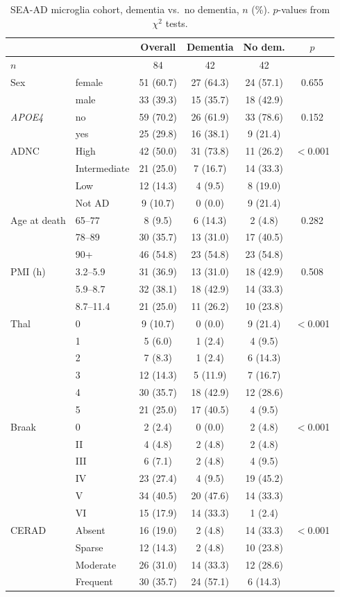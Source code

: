 \documentclass[10pt,twocolumn,letterpaper]{article}
\newcommand{\gene}[1]{\textit{#1}}
\begin{document}
\begin{table}[!htb]
\centering\scriptsize
\caption{SEA-AD microglia cohort, dementia vs.\ no dementia, $n$ (\%). $p$-values from $\chi^2$ tests.}
\label{tab:cohort}
\setlength{\tabcolsep}{2.5pt}
\begin{tabular}{llccc c}
\toprule
& & Overall & Dementia & No dem. & $p$ \\
\midrule
$n$ & & 84 & 42 & 42 & \\
Sex & female & 51 (60.7) & 27 (64.3) & 24 (57.1) & 0.655 \\
 & male & 33 (39.3) & 15 (35.7) & 18 (42.9) & \\
\gene{APOE4} & no & 59 (70.2) & 26 (61.9) & 33 (78.6) & 0.152\\
 & yes & 25 (29.8) & 16 (38.1) & 9 (21.4) & \\
ADNC & High & 42 (50.0) & 31 (73.8) & 11 (26.2) & $<$0.001\\
 & Intermediate & 21 (25.0) & 7 (16.7) & 14 (33.3) & \\
 & Low & 12 (14.3) & 4 (9.5) & 8 (19.0) & \\
 & Not AD & 9 (10.7) & 0 (0.0) & 9 (21.4) & \\
Age at death & 65--77 & 8 (9.5) & 6 (14.3) & 2 (4.8) & 0.282\\
 & 78--89 & 30 (35.7) & 13 (31.0) & 17 (40.5) & \\
 & 90+ & 46 (54.8) & 23 (54.8) & 23 (54.8) & \\
PMI (h) & 3.2--5.9 & 31 (36.9) & 13 (31.0) & 18 (42.9) & 0.508\\
 & 5.9--8.7 & 32 (38.1) & 18 (42.9) & 14 (33.3) & \\
 & 8.7--11.4 & 21 (25.0) & 11 (26.2) & 10 (23.8) & \\
Thal & 0 & 9 (10.7) & 0 (0.0) & 9 (21.4) & $<$0.001\\
 & 1 & 5 (6.0) & 1 (2.4) & 4 (9.5) & \\
 & 2 & 7 (8.3) & 1 (2.4) & 6 (14.3) & \\
 & 3 & 12 (14.3) & 5 (11.9) & 7 (16.7) & \\
 & 4 & 30 (35.7) & 18 (42.9) & 12 (28.6) & \\
 & 5 & 21 (25.0) & 17 (40.5) & 4 (9.5) & \\
Braak & 0 & 2 (2.4) & 0 (0.0) & 2 (4.8) & $<$0.001\\
 & II & 4 (4.8) & 2 (4.8) & 2 (4.8) & \\
 & III & 6 (7.1) & 2 (4.8) & 4 (9.5) & \\
 & IV & 23 (27.4) & 4 (9.5) & 19 (45.2) & \\
 & V & 34 (40.5) & 20 (47.6) & 14 (33.3) & \\
 & VI & 15 (17.9) & 14 (33.3) & 1 (2.4) & \\
CERAD & Absent & 16 (19.0) & 2 (4.8) & 14 (33.3) & $<$0.001\\
 & Sparse & 12 (14.3) & 2 (4.8) & 10 (23.8) & \\
 & Moderate & 26 (31.0) & 14 (33.3) & 12 (28.6) & \\
 & Frequent & 30 (35.7) & 24 (57.1) & 6 (14.3) & \\
\bottomrule
\end{tabular}
\end{table}
\end{document}
